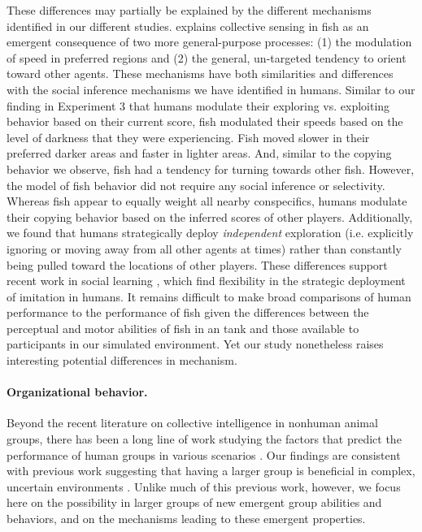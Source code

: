 \documentclass[12pt,letterpaper]{article}
\begin{document}
These differences may partially be explained by the different mechanisms identified in our different studies.
 explains collective sensing in fish as an emergent consequence of two more general-purpose processes: (1) the modulation of speed in preferred regions and (2) the general, un-targeted tendency to orient toward other agents.
These mechanisms have both similarities and differences with the social inference mechanisms we have identified in humans.
Similar to our finding in Experiment 3 that humans modulate their exploring vs. exploiting behavior based on their current score, fish modulated their speeds based on the level of darkness that they were experiencing.  
Fish moved slower in their preferred darker areas and faster in lighter areas.  
And, similar to the copying behavior we observe, fish had a tendency for turning towards other fish.  
However, the model of fish behavior  did not require any social inference or selectivity. 
Whereas fish appear to equally weight all nearby conspecifics, humans modulate their copying behavior based on the inferred scores of other players.
Additionally, we found that humans strategically deploy \emph{independent} exploration (i.e. explicitly ignoring or moving away from all other agents at times) rather than constantly being pulled toward the locations of other players. 
These differences support recent work in social learning \cite{wisdom_social_2013, mcelreath_beyond_2008}, which find flexibility in the strategic deployment of imitation in humans.
It remains difficult to make broad comparisons of human performance to the performance of fish given the differences between the perceptual and motor abilities of fish in an tank and those available to participants in our simulated environment. 
Yet our study nonetheless raises interesting potential differences in mechanism.  

\paragraph{Organizational behavior.}


Beyond the recent literature on collective intelligence in nonhuman animal groups, there has been a long line of work studying the factors that predict the performance of human groups in various scenarios \cite{kerr_group_2004}.  
Our findings are consistent with previous work suggesting that having a larger group is beneficial in complex, uncertain environments \cite{stewart_meta-analytic_2006}.  
Unlike much of this previous work, however, we focus here on the possibility in larger groups of new emergent group abilities and behaviors, and on the mechanisms leading to these emergent properties.
\end{document}
